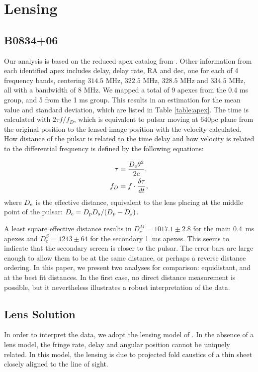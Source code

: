 \documentclass[useAMS,usenatbib]{mn2e}
\begin{document}
\section{Lensing}
\subsection{B0834+06}

Our analysis is based on the reduced apex catalog from
\citet{2010ApJ...708..232B}. Other information from each identified apex includes delay,
delay rate, RA and dec, one for each of 4 frequency bands, centering $314.5$ MHz, $322.5$ MHz, $328.5$ MHz and $334.5$ MHz, all with a bandwidth of $8$ MHz.  We mapped
a total of 9 apexes from the 0.4 ms group, and 5 from the 1 ms
group. This results in an estimation
for the mean value and standard deviation, which are listed in Table
\ref{table:apex}. The time is calculated with $2{\tau}f/{f_{D}}$,
which is equivalent to pulsar moving at $640$pc plane from the
original position to the lensed image position with the velocity
calculated. How distance of the pulsar is related to the time delay and how velocity is related to the differential frequency is defined by the following equations:

\begin{align*}
\tau &=\frac{D_{\rm e}{\theta}^2}{2c}, \\
f_D  &=f\cdot\frac{\delta\tau}{dt},
\end{align*} 
where ${D_{\rm e}}$ is the effective distance, equivalent to the lens placing at the middle point of the pulsar: $D_{\rm e}={D_p D_s}/({D_p - D_s})$. 

A least square effective distance results in
$D_e^M=1017.1\pm 2.8$ for the main 0.4\ ms apexes and
$D_e^S = 1243 \pm 64$ for the secondary 1\ ms apexes. This seems to
indicate that the secondary screen is closer to the pulsar. The error
bars are large enough to allow them to be at the same distance, or
perhaps a reverse distance ordering.  In this paper, we present two
analyses for comparison: equidistant, and at the best fit distances.
In the first case, no direct distance measurement is possible, but it
nevertheless illustrates a robust interpretation of the data.


\subsection{Lens Solution}

In order to interpret the data, we adopt the lensing model of
\citet{2014MNRAS.442.3338P}.  In the absence of a lens model, the
fringe rate, delay and angular position cannot be uniquely related. In
this model, the lensing is due to projected fold caustics of a thin
sheet closely aligned to the line of sight.
\end{document}

